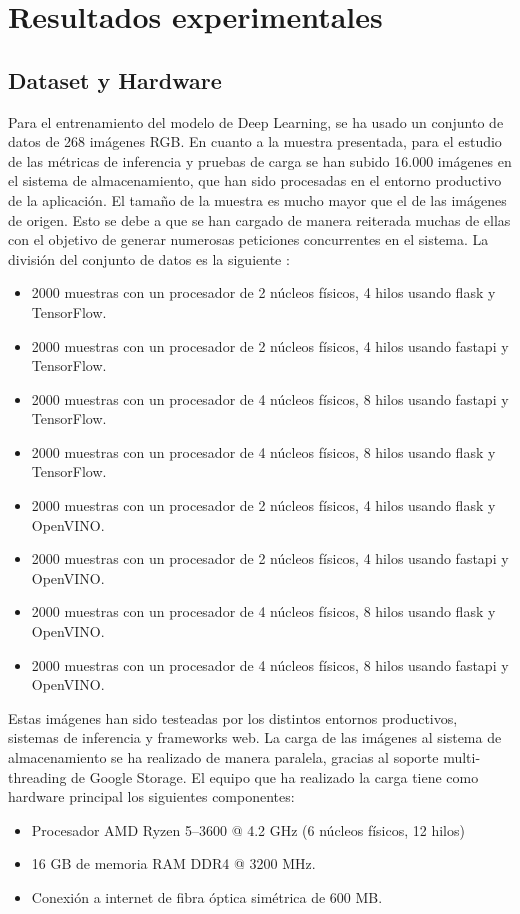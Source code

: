 \mbox{}


\chapter{Resultados experimentales}
\label{ch:chapte5}


\section{Dataset y Hardware}\label{sec:dataset-usado}
Para el entrenamiento del modelo de Deep Learning, se ha usado un conjunto de datos de 268 imágenes RGB\@.
En cuanto a la muestra presentada, para el estudio de las métricas de inferencia y pruebas de carga se han subido 16.000 imágenes en el sistema de almacenamiento, que han sido procesadas en el entorno productivo de la aplicación.
El tamaño de la muestra es mucho mayor que el de las imágenes de origen.
Esto se debe a que se han cargado de manera reiterada muchas de ellas con el objetivo de generar numerosas peticiones concurrentes en el sistema. La división del conjunto de datos es la siguiente :
\begin{itemize}
    \item 2000 muestras con un procesador de 2 núcleos físicos, 4 hilos usando flask y TensorFlow.
    \item 2000 muestras con un procesador de 2 núcleos físicos, 4 hilos usando fastapi y TensorFlow.
    \item 2000 muestras con un procesador de 4 núcleos físicos, 8 hilos usando fastapi y TensorFlow.
    \item 2000 muestras con un procesador de 4 núcleos físicos, 8 hilos usando flask y TensorFlow.
    \item 2000 muestras con un procesador de 2 núcleos físicos, 4 hilos usando flask y OpenVINO\@.
    \item 2000 muestras con un procesador de 2 núcleos físicos, 4 hilos usando fastapi y OpenVINO\@.
    \item 2000 muestras con un procesador de 4 núcleos físicos, 8 hilos usando flask y OpenVINO\@.
    \item 2000 muestras con un procesador de 4 núcleos físicos, 8 hilos usando fastapi y OpenVINO\@.
\end{itemize}

Estas imágenes han sido testeadas por los distintos entornos productivos, sistemas de inferencia y frameworks web.
La carga de las imágenes al sistema de almacenamiento se ha realizado de manera paralela, gracias al soporte multi-threading de Google Storage.
El equipo que ha realizado la carga tiene como hardware principal los siguientes componentes:
\begin{itemize}
    \item Procesador AMD Ryzen 5--3600 @ 4.2 GHz (6 núcleos físicos, 12 hilos)
    \item 16 GB de memoria RAM DDR4 @ 3200 MHz.
    \item Conexión a internet de fibra óptica simétrica de 600 MB\@.
\end{itemize}

